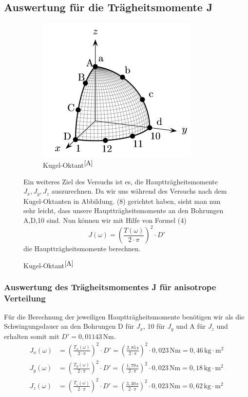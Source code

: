 \documentclass[fontsize=12pt]{scrartcl}
\begin{document}
\subsection{ Auswertung für die Trägheitsmomente J}
\begin{figure}[h!]
\begin{minipage}{\textwidth}
\begin{figure}
	\vspace{-20pt}
                \includegraphics[scale=0.7]{Graphik/Kugel-Oktant}             
			\caption{Kugel-Oktant$^{\cite{A}}$}
	\end{figure}
Ein weiteres Ziel des Versuchs ist es, die Hauptträgheitsmomente $J_x,J_y,J_z$ auszurechnen. Da wir uns während des Versuchs nach dem Kugel-Oktanten in Abbildung. 
(8) gerichtet haben, sieht man nun sehr leicht, dass unsere Hauptträgheitsmomente an den Bohrungen A,D,10 sind. Nun können wir mit Hilfe von Formel (4) 
\begin{equation*}
J(\omega)=\left ( \frac{T(\omega)}{2 \cdot \pi }\right)^2 \cdot D'
\end{equation*}
die Hauptträgheitsmomente berechnen.
\end{minipage}
\end{figure}
\subsubsection{Auswertung des Trägheitsmomentes J für anisotrope Verteilung}
Für die Berechnung der jeweiligen Hauptträgheitsmomente benötigen wir als die Schwingungsdauer an den Bohrungen D für $J_x$, 10 für $J_y$ und A für $J_z$ und erhalten somit mit $D'= 0,01143\,\text{Nm}$.
\begin{align*}
J_x(\omega) &=\left ( \frac{T_x(\omega)}{2 \cdot \pi }\right)^2 \cdot D' = \left ( \frac{2,85\,\text{s}}{2 \cdot \pi }\right)^2 \cdot  0,023\,\text{Nm}
=0,46\,\text{kg$\cdot$m$^2$} \\
J_y(\omega) &=\left ( \frac{T_y(\omega)}{2 \cdot \pi }\right)^2 \cdot D' = \left ( \frac{1,79\,\text{s}}{2 \cdot \pi }\right)^2 \cdot  0,023\,\text{Nm}
=0,18\,\text{kg$\cdot$m$^2$} \\
J_z(\omega) &=\left ( \frac{T_z(\omega)}{2 \cdot \pi }\right)^2 \cdot D' = \left ( \frac{3,30\,\text{s}}{2 \cdot \pi }\right)^2 \cdot  0,023\,\text{Nm}
=0,62\,\text{kg$\cdot$m$^2$} \\
\end{align*}
\end{document}
